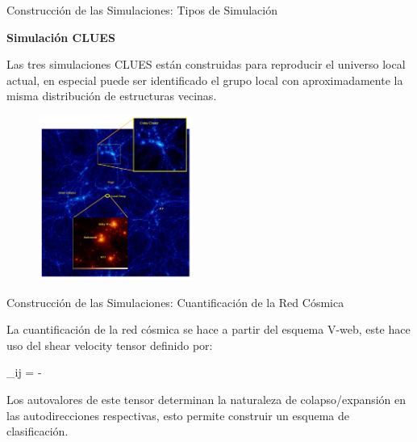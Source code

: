 \documentclass[8pt,fleqn]{beamer}
\begin{document}
\begin{frame}
\begin{block}{Construcción de las Simulaciones: Tipos de Simulación}\justifying

\textbf{Simulación CLUES}

Las tres simulaciones CLUES están construidas para reproducir el universo
local actual, en especial puede ser identificado el grupo local con 
aproximadamente la misma distribución de estructuras vecinas.

\begin{figure}[htbp]
	\centering
	\includegraphics[trim = 0mm 0mm 0mm 0mm, clip, width=0.45\textwidth]
	{./figures/CLUES_Overview.png}
\end{figure}

\end{block}
\end{frame}
\begin{frame}
\begin{block}{Construcción de las Simulaciones: Cuantificación de la Red Cósmica}
\justifying

La cuantificación de la red cósmica se hace a partir del esquema V-web, este
hace uso del shear velocity tensor definido por:

{ \Sigma_{ij} = - }

Los autovalores de este tensor determinan la naturaleza de
colapso/expansión en las autodirecciones respectivas, esto permite construir
un esquema de clasificación.

\end{block}
\end{frame}
\end{document}
